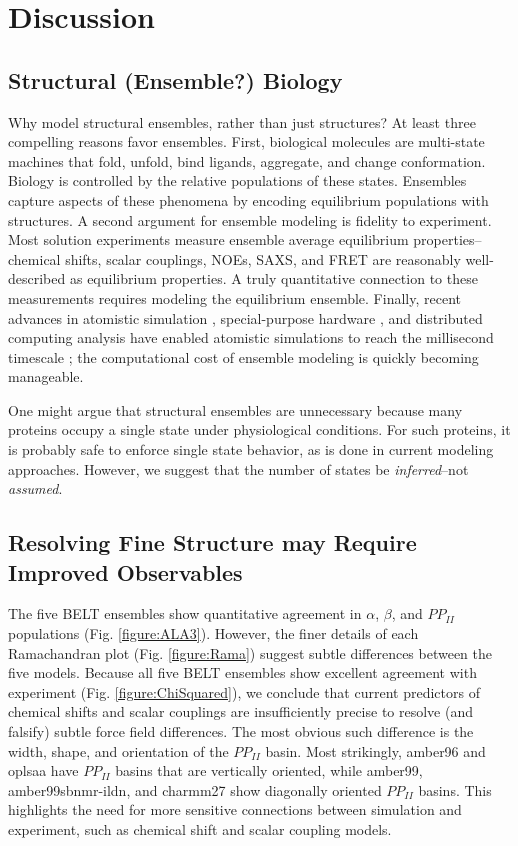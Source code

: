 \documentclass[11pt,titlepage]{article}
\begin{document}
\section*{Discussion}

\subsection*{Structural (Ensemble?) Biology}

Why model structural ensembles, rather than just structures?  At least three compelling reasons favor ensembles.  First, biological molecules are multi-state machines that fold, unfold, bind ligands, aggregate, and change conformation.  Biology is controlled by the relative populations of these states.  Ensembles capture aspects of these phenomena by encoding equilibrium populations with structures.  A second argument for ensemble modeling is fidelity to experiment.  Most solution experiments measure ensemble average equilibrium properties--chemical shifts, scalar couplings, NOEs, SAXS, and FRET are reasonably well-described as equilibrium properties.  A truly quantitative connection to these measurements requires modeling the equilibrium ensemble.  Finally, recent advances in atomistic simulation \citep{hess2008, pronk2013gromacs, eastman2012openmm, eastman2010openmm}, special-purpose hardware \citep{Shaw2008}, and distributed computing analysis \citep{emma, msmb2} have enabled atomistic simulations to 
reach 
the millisecond timescale \citep{voelz2010, bowman2011atomistic, shaw2010, Shaw2011}; the computational cost of ensemble modeling is quickly becoming manageable.

One might argue that structural ensembles are unnecessary because many proteins occupy a single state under physiological conditions.  For such proteins, it is probably safe to enforce single state behavior, as is done in current modeling approaches. However, we suggest that the number of states be \emph{inferred}--not \emph{assumed}.  


\subsection*{Resolving Fine Structure may Require Improved Observables}

The five BELT ensembles show quantitative agreement in $\alpha$, $\beta$, and $PP_{II}$ populations (Fig. \ref{figure:ALA3}).  However, the finer details of each Ramachandran plot (Fig. \ref{figure:Rama}) suggest subtle differences between the 
five models.  Because all five BELT ensembles show excellent agreement with experiment (Fig. \ref{figure:ChiSquared}), we conclude that current predictors of chemical shifts and scalar couplings are insufficiently precise to resolve (and falsify) subtle force field differences.  The most obvious such difference is the width, shape, and orientation of the $PP_{II}$ basin.  Most strikingly, amber96 and oplsaa have $PP_{II}$ basins that are vertically oriented, while amber99, amber99sbnmr-ildn, and charmm27 show diagonally oriented $PP_{II}$ basins.  This highlights the need for more sensitive connections between simulation and experiment, such as chemical shift and scalar coupling models.
\end{document}
